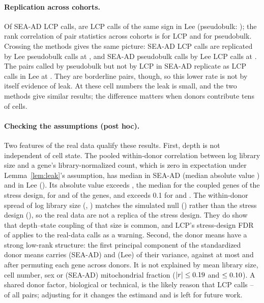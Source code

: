 \paragraph{Replication across cohorts.} Of SEA-AD LCP calls, \replLCP{} are LCP calls of the same sign in Lee (pseudobulk: \replPB{}); the rank correlation of pair statistics across cohorts is \rhoLCP{} for LCP and \rhoPB{} for pseudobulk. Crossing the methods gives the same picture: SEA-AD LCP calls are replicated by Lee pseudobulk calls at \xLCPbyPB{}, and SEA-AD pseudobulk calls by Lee LCP calls at \xPBbyLCP{}. The \nPBonly{} pairs called by pseudobulk but not by LCP in SEA-AD replicate as LCP calls in Lee at \replPBonly{}. They are borderline pairs, though, so this lower rate is not by itself evidence of leak. At these cell numbers the leak is small, and the two methods give similar results; the difference matters when donors contribute tens of cells.





\paragraph{Checking the assumptions (post hoc).} Two features of the real data qualify these results. First, depth is not independent of cell state. The pooled within-donor correlation between log library size and a gene's library-normalized count, which is zero in expectation under Lemma~\ref{lem:leak}'s assumption, has median \cplMedSEAAD{} in SEA-AD (median absolute value \cplAbsSEAAD{}) and \cplMedLEE{} in Lee (\cplAbsLEE{}). Its absolute value exceeds \cplStressW{}, the median for the coupled genes of the stress design, for \cplFracSSEAAD{} and \cplFracSLEE{} of the genes, and exceeds 0.1 for \cplFracTSEAAD{} and \cplFracTLEE{}. The within-donor spread of log library size (\sdLibSEAAD{}, \sdLibLEE{}) matches the simulated null (\sdLibNull{}) rather than the stress design (\sdLibStress{}), so the real data are not a replica of the stress design. They do show that depth--state coupling of that size is common, and LCP's stress-design FDR of \STRESSLCPFDR{} applies to the real-data calls as a warning. Second, the donor means have a strong low-rank structure: the first principal component of the standardized donor means carries \pcOneSEAAD{} (SEA-AD) and \pcOneLEE{} (Lee) of their variance, against at most \pcNullSEAAD{} and \pcNullLEE{} after permuting each gene across donors. It is not explained by mean library size, cell number, sex or (SEA-AD) mitochondrial fraction ($|r|\le0.19{}$ and $\le0.10{}$). A shared donor factor, biological or technical, is the likely reason that LCP calls \SEAADfullLCPfrac{}--\LEEfullLCPfrac{} of all pairs; adjusting for it changes the estimand and is left for future work.
